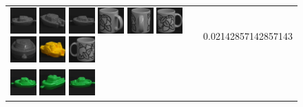 \begin{figure}[tbp]
\begin{center}
\begin{tabular}{m{11cm} | m{3cm} |}
\includegraphics[width=1cm]{coil/beeld-27.eps}
\includegraphics[width=1cm]{coil/beeld-25.eps}
\includegraphics[width=1cm]{coil/beeld-24.eps}
\includegraphics[width=1cm]{coil/beeld-49.eps}
\includegraphics[width=1cm]{coil/beeld-50.eps}
\includegraphics[width=1cm]{coil/beeld-48.eps}
\includegraphics[width=1cm]{coil/beeld-28.eps}
\includegraphics[width=1cm]{coil/beeld-16.eps}
\includegraphics[width=1cm]{coil/beeld-51.eps}
& {\scriptsize 0.02142857142857143}
\\
\includegraphics[width=1cm]{coil/beeld-54.eps}
\includegraphics[width=1cm]{coil/beeld-57.eps}
\includegraphics[width=1cm]{coil/beeld-55.eps}

\end{tabular}
\end{center}
\end{figure}
